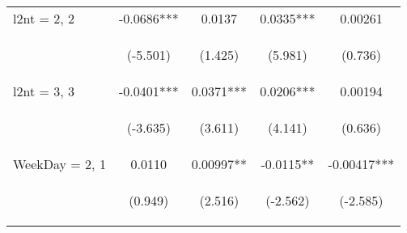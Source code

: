 \documentclass[]{article}
\begin{document}
\begin{center}
\begin{tabular}{lcccc}
        l2nt = 2, 2      & -0.0686***                                      & 0.0137                                         & 0.0335***                                      & 0.00261                                        \\
        \vspace{4pt}     & \begin{footnotesize}(-5.501)\end{footnotesize}  & \begin{footnotesize}(1.425)\end{footnotesize}  & \begin{footnotesize}(5.981)\end{footnotesize}  & \begin{footnotesize}(0.736)\end{footnotesize}  \\
        l2nt = 3, 3      & -0.0401***                                      & 0.0371***                                      & 0.0206***                                      & 0.00194                                        \\
        \vspace{4pt}     & \begin{footnotesize}(-3.635)\end{footnotesize}  & \begin{footnotesize}(3.611)\end{footnotesize}  & \begin{footnotesize}(4.141)\end{footnotesize}  & \begin{footnotesize}(0.636)\end{footnotesize}  \\
        WeekDay = 2, 1   & 0.0110                                          & 0.00997**                                      & -0.0115**                                      & -0.00417***                                    \\
        \vspace{4pt}     & \begin{footnotesize}(0.949)\end{footnotesize}   & \begin{footnotesize}(2.516)\end{footnotesize}  & \begin{footnotesize}(-2.562)\end{footnotesize} & \begin{footnotesize}(-2.585)\end{footnotesize} \\

\end{tabular}
\end{center}
\end{document}
